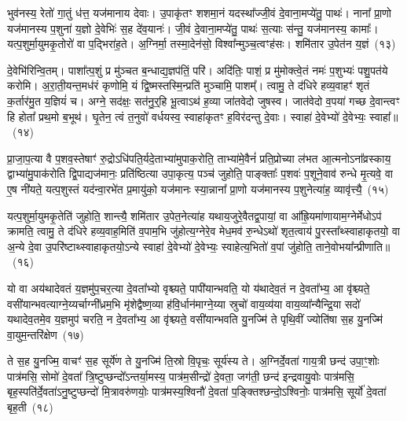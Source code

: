भुव॑नस्य॒ रेतो॑ गा॒तुं ध॑त्त॒ यज॑मानाय देवाः। उ॒पाकृ॑तꣳ शशमा॒नं यदस्था᳚ज्जी॒वं दे॒वाना॒मप्ये॑तु॒ पाथः॑। नाना᳚ प्रा॒णो यज॑मानस्य प॒शुना॑ य॒ज्ञो दे॒वेभिः॑ स॒ह दे॑व॒यानः॑। जी॒वं दे॒वाना॒मप्ये॑तु॒ पाथः॑ स॒त्याः स॑न्तु॒ यज॑मानस्य॒ कामाः᳚। यत्प॒शुर्मा॒युमकृ॒तोरो॑ वा प॒द्भिरा॑ह॒ते। अ॒ग्निर्मा॒ तस्मा॒देन॑सो॒ विश्वा᳚न्मुञ्च॒त्वꣳह॑सः। शमि॑तार उ॒पेत॑न य॒ज्ञं~(१३)

दे॒वेभि॑रिन्वि॒तम्। पाशा᳚त्प॒शुं प्र मु॑ञ्चत ब॒न्धाद्य॒ज्ञप॑तिं॒ परि॑। अदि॑तिः॒ पाशं॒ प्र मु॑मोक्त्वे॒तं नमः॑ प॒शुभ्यः॑ पशु॒पत॑ये करोमि। अ॒रा॒ती॒यन्त॒मध॑रं कृणोमि॒ यं द्वि॒ष्मस्तस्मि॒न्प्रति॑ मुञ्चामि॒ पाशम्᳚। त्वामु॒ ते द॑धिरे हव्य॒वाहꣳ॑ शृतं क॒र्तार॑मु॒त य॒ज्ञियं॑ च। अग्ने॒ सद॑क्षः॒ सत॑नु॒र्॒\mbox{}हि भू॒त्वा\-ऽथ॑ ह॒व्या जा॑तवेदो जुषस्व। जात॑वेदो व॒पया॑ गच्छ दे॒वान्त्वꣳ हि होता᳚ प्रथ॒मो ब॒भूथ॑। घृ॒तेन॒ त्वं त॒नुवो॑ वर्धयस्व॒ स्वाहा॑कृतꣳ ह॒विर॑दन्तु दे॒वाः। स्वाहा॑ दे॒वेभ्यो॑ दे॒वेभ्यः॒ स्वाहा᳚॥~(१४)

{\anuvakamend[{ईशे᳚ प्रमु॒ञ्चमा॑ना य॒ज्ञन्त्वꣳ षोड॑श च}]}%

प्रा॒जा॒प॒त्या वै प॒शव॒स्तेषाꣳ॑ रु॒द्रो\-ऽधि॑\-पति॒र्यदे॒ताभ्या॑मुपाक॒रोति॒ ताभ्या॑मे॒वैनं॑ प्रति॒प्रोच्या ल॑भत आ॒त्मनो\-ऽना᳚व्रस्काय॒ द्वाभ्या॑मु॒पा\-क॑रोति द्वि॒पाद्यज॑मानः॒ प्रति॑ष्ठित्या उपा॒कृत्य॒ पञ्च॑ जुहोति॒ पाङ्क्ताः᳚ प॒शवः॑ प॒शूने॒वाव॑ रुन्धे मृ॒त्यवे॒ वा ए॒ष नी॑यते॒ यत्प॒शुस्तं यद॑न्वा॒रभे॑त प्र॒मायु॑को॒ यज॑मानः स्या॒न्नाना᳚ प्रा॒णो यज॑मानस्य प॒शुनेत्या॑ह॒ व्यावृ॑त्त्यै॒~(१५)

यत्प॒शुर्मा॒युमकृ॒तेति॑ जुहोति॒ शान्त्यै॒ शमि॑तार उ॒पेत॒नेत्या॑ह यथाय॒जुरे॒वैतद्व॒पायां॒ वा आ᳚ह्रि॒यमा॑णायाम॒ग्नेर्मेधो\-ऽप॑ क्रामति॒ त्वामु॒ ते द॑धिरे हव्य॒वाह॒मिति॑ व॒पाम॒भि जु॑होत्य॒ग्नेरे॒व मेध॒मव॑ रु॒न्धे\-ऽथो॑ शृत॒त्वाय॑ पु॒रस्ता᳚थ्\-स्वाहाकृतयो॒ वा अ॒न्ये दे॒वा उ॒परि॑ष्टाथ्\-स्वाहाकृतयो॒\-ऽन्ये स्वाहा॑ दे॒वेभ्यो॑ दे॒वेभ्यः॒ स्वाहेत्य॒भितो॑ व॒पां जु॑होति॒ ताने॒वोभया᳚न्प्रीणाति॥~(१६)

{\anuvakamend[{व्यावृ॑त्त्या अ॒भितो॑ व॒पां पञ्च॑ च}]}%

यो वा अय॑थादेवतं य॒ज्ञमु॑प॒चर॒त्या दे॒वता᳚भ्यो वृश्च्यते॒ पापी॑यान्भवति॒ यो य॑थादेव॒तं न दे॒वता᳚भ्य॒ आ वृ॑श्च्यते॒ वसी॑यान्भवत्याग्ने॒य्यर्चाग्नी᳚ध्रम॒भि मृ॑शेद्वैष्ण॒व्या ह॑वि॒र्धान॑माग्ने॒य्या स्रुचो॑ वाय॒व्य॑या वाय॒व्या᳚न्यैन्द्रि॒या सदो॑ यथादेव॒तमे॒व य॒ज्ञमुप॑ चरति॒ न दे॒वता᳚भ्य॒ आ वृ॑श्च्यते॒ वसी॑यान्भवति यु॒नज्मि॑ ते पृथि॒वीं ज्योति॑षा स॒ह यु॒नज्मि॑ वा॒युम॒न्तरि॑क्षेण~(१७)

ते स॒ह यु॒नज्मि॒ वाचꣳ॑ स॒ह सूर्ये॑ण ते यु॒नज्मि॑ ति॒स्रो वि॒पृचः॒ सूर्य॑स्य ते। अ॒ग्निर्दे॒वता॑ गाय॒त्री छन्द॑ उपा॒ꣳ॒शोः पात्र॑मसि॒ सोमो॑ दे॒वता᳚ त्रि॒ष्टुप्छन्दो᳚\-ऽन्तर्या॒मस्य॒ पात्र॑म॒सीन्द्रो॑ दे॒वता॒ जग॑ती॒ छन्द॑ इन्द्रवायु॒वोः पात्र॑मसि॒ बृह॒स्पति॑र्दे॒वता॑\-ऽनु॒ष्टुप्छन्दो॑ मि॒त्रावरु॑णयोः॒ पात्र॑मस्य॒श्विनौ॑ दे॒वता॑ प॒ङ्क्तिश्छन्दो॒\-ऽश्विनोः॒ पात्र॑मसि॒ सूर्यो॑ दे॒वता॑ बृह॒ती~(१८)

